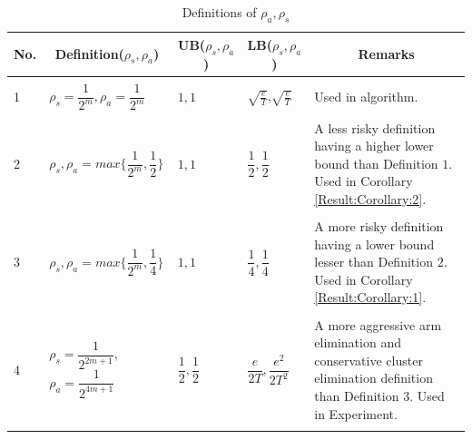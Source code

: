\begin{table}
\caption{Definitions of $\rho_{a},\rho_{s}$}
\label{App:E:table:1}
\begin{center}
\begin{tabular}{p{1cm}p{3.5cm}p{1cm}p{1cm}p{4.5cm}}
\multicolumn{1}{c}{\bf No.} &\multicolumn{1}{c}{\bf Definition($\rho_{s},\rho_{a}$)}  &\multicolumn{1}{c}{\bf UB($\rho_{s},\rho_{a}$)} &\multicolumn{1}{c}{\bf LB($\rho_{s},\rho_{a}$)} &\multicolumn{1}{c}{\bf Remarks} \\
\hline \\
1	&$\rho_{s}=\dfrac{1}{2^{m}},\rho_{a}=\dfrac{1}{2^{m}}$         & $1,1$  &$\sqrt{\frac{e}{T}}$,$\sqrt{\frac{e}{T}}$ & Used in algorithm. \\
\hline\\ 
2	&$\rho_{s},\rho_{a}=max\bigg\lbrace\dfrac{1}{2^{m}},\dfrac{1}{2}\bigg\rbrace$         & $1,1$  &$\dfrac{1}{2},\dfrac{1}{2}$ & A less risky definition having a higher lower bound than Definition $1$. Used in Corollary \ref{Result:Corollary:2}.\\
\hline\\ 
3	&$\rho_{s},\rho_{a}=max\bigg\lbrace\dfrac{1}{2^{m}},\dfrac{1}{4}\bigg\rbrace$         & $1,1$  &$\dfrac{1}{4},\dfrac{1}{4}$ & A more risky definition having a lower bound lesser than Definition $2$. Used in Corollary \ref{Result:Corollary:1}.\\
\hline\\ 
4	&$\rho_{s}=\dfrac{1}{2^{2m+1}},$ $\rho_{a}=\dfrac{1}{2^{4m+1}}$         & $\dfrac{1}{2},\dfrac{1}{2}$  &$\dfrac{e}{2T},\dfrac{e^{2}}{2T^{2}}$ & A more aggressive arm elimination and conservative cluster elimination definition than Definition $3$. Used in Experiment.\\
\hline\\
\end{tabular}
\end{center}
\end{table}

